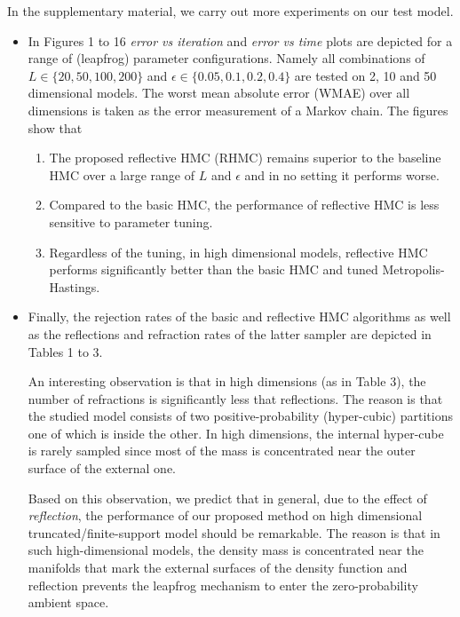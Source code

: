 \documentclass{article} %
\begin{document}
In the supplementary material, we carry out more experiments on our test model.
\begin{itemize}
\item In Figures 1 to 16 \emph{error vs iteration} and \emph{error vs time} plots are depicted for a range of (leapfrog) parameter configurations. Namely all combinations of $L \in \{20, 50, 100, 200\}$ and $\epsilon \in \{0.05, 0.1, 0.2, 0.4\}$ are tested on 2, 10 and 50 dimensional models. 
The worst mean absolute error (WMAE) over all dimensions is taken as the error measurement of a Markov chain. 
The figures show that 
\begin{enumerate}
\item 
The proposed reflective HMC (RHMC) remains superior to the baseline HMC over a large range of $L$ and $\epsilon$ and in no setting it performs worse.
\item Compared to the basic HMC, the performance of reflective HMC is less sensitive to parameter tuning.
\item Regardless of the tuning, in high dimensional models, reflective HMC performs significantly better than the basic HMC and tuned Metropolis-Hastings.
 \end{enumerate}
\item Finally, the rejection rates of the basic and reflective HMC algorithms as well as the reflections and refraction rates of the latter sampler are depicted in Tables 1 to 3. 

An interesting observation is that in high dimensions (as in Table 3), the number of refractions is significantly less that reflections. 
The reason is that the studied model consists of  two positive-probability (hyper-cubic) partitions one of which is inside the other. In high dimensions, the internal hyper-cube is rarely sampled since most of the mass is concentrated near the outer surface of the external one. 

Based on this observation, we predict that in general, due to the effect of \emph{reflection}, the performance of our proposed method on high dimensional truncated/finite-support model should be remarkable.
The reason is that in such high-dimensional models, the density mass is concentrated near the manifolds that mark the external surfaces of the density function and reflection prevents the leapfrog mechanism to enter the zero-probability ambient space. 
\end{itemize}
\end{document}
